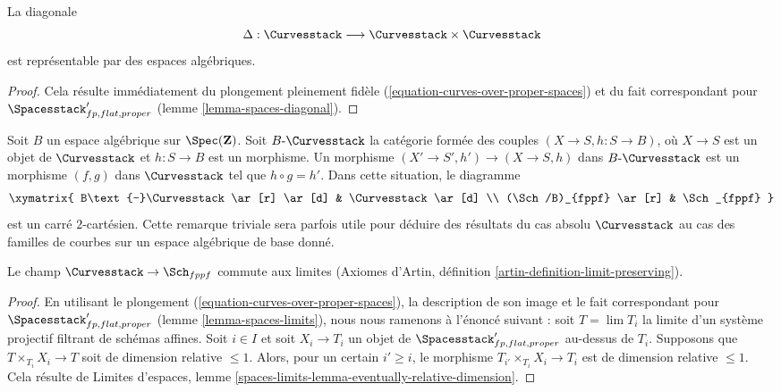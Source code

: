 \begin{lemma}
\label{lemma-curves-diagonal}
La diagonale
$$
\Delta : \Curvesstack \longrightarrow \Curvesstack \times \Curvesstack
$$
est représentable par des espaces algébriques.
\end{lemma}

\begin{proof}
Cela résulte immédiatement du plongement pleinement fidèle
(\ref{equation-curves-over-proper-spaces}) et du fait correspondant pour
$\Spacesstack'_{fp, flat, proper}$
(lemme \ref{lemma-spaces-diagonal}).
\end{proof}

\begin{remark}
\label{remark-curves-base-change}
Soit $B$ un espace algébrique sur $\Spec(\mathbf{Z})$.
Soit $B\text{-}\Curvesstack$ la catégorie formée des couples
$(X \to S, h : S \to B)$, où $X \to S$ est un objet de $\Curvesstack$ et
$h : S \to B$ est un morphisme.
Un morphisme $(X' \to S', h') \to (X \to S, h)$ dans
$B\text{-}\Curvesstack$ est un morphisme $(f, g)$ dans $\Curvesstack$ tel que
$h \circ g = h'$.
Dans cette situation, le diagramme
$$
\xymatrix{
B\text{-}\Curvesstack \ar[r] \ar[d] & \Curvesstack \ar[d] \\
(\Sch/B)_{fppf} \ar[r] & \Sch_{fppf}
}
$$
est un carré $2$-cartésien. Cette remarque triviale sera parfois utile
pour déduire des résultats du cas absolu $\Curvesstack$ au cas des familles de
courbes sur un espace algébrique de base donné.
\end{remark}

\begin{lemma}
\label{lemma-curves-limits}
Le champ $\Curvesstack \to \Sch_{fppf}$ commute aux limites
(Axiomes d'Artin, définition \ref{artin-definition-limit-preserving}).
\end{lemma}

\begin{proof}
En utilisant le plongement (\ref{equation-curves-over-proper-spaces}),
la description de son image et le fait correspondant pour
$\Spacesstack'_{fp, flat, proper}$ (lemme \ref{lemma-spaces-limits}),
nous nous ramenons à l'énoncé suivant :
soit $T = \lim T_i$ la limite d'un système projectif filtrant de schémas
affines. Soit $i \in I$ et soit $X_i \to T_i$ un objet de
$\Spacesstack'_{fp, flat, proper}$ au-dessus de $T_i$.
Supposons que $T \times_{T_i} X_i \to T$ soit de dimension relative
$\leq 1$. Alors, pour un certain $i' \geq i$, le morphisme
$T_{i'} \times_{T_i} X_i \to T_i$ est de dimension relative $\leq 1$.
Cela résulte de Limites d'espaces, lemme
\ref{spaces-limits-lemma-eventually-relative-dimension}.
\end{proof}

